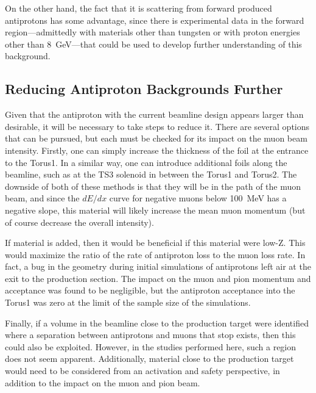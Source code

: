 On the other hand, the fact that it is scattering from forward produced antiprotons has some advantage, since there is experimental data in the forward region---admittedly with materials other than tungsten or with proton energies other than 8~GeV---that could be used to develop further understanding of this background.

\subsection{Reducing Antiproton Backgrounds Further}
Given that the antiproton with the current beamline design appears larger than desirable, it will be necessary to take steps to reduce it.
There are several options that can be pursued, but each must be checked for its impact on the muon beam intensity.
Firstly, one can simply increase the thickness of the foil at the entrance to the Torus1.
In a similar way, one can introduce additional foils along the beamline, such as at the TS3 solenoid in between the Torus1 and Torus2.
The downside of both of these methods is that they will be in the path of the muon beam, and since the $dE/dx$ curve for negative muons below 100~MeV has a negative slope, this material will likely increase the mean muon momentum (but of course decrease the overall intensity).

If material is added, then it would be beneficial if this material were low-Z.  This would maximize the ratio of the rate of antiproton loss to the muon loss rate.
In fact, a bug in the geometry during initial simulations of antiprotons left air at the exit to the production section.  
The impact on the muon and pion momentum and acceptance was found to be negligible, but the antiproton acceptance into the Torus1 was zero at the limit of the sample size of the simulations.

Finally, if a volume in the beamline close to the production target were identified where a separation between antiprotons and muons that stop exists, then this could also be exploited.
However, in the studies performed here, such a region does not seem apparent.
Additionally, material close to the production target would need to be considered from an activation and safety perspective, in addition to the impact on the muon and pion beam.

